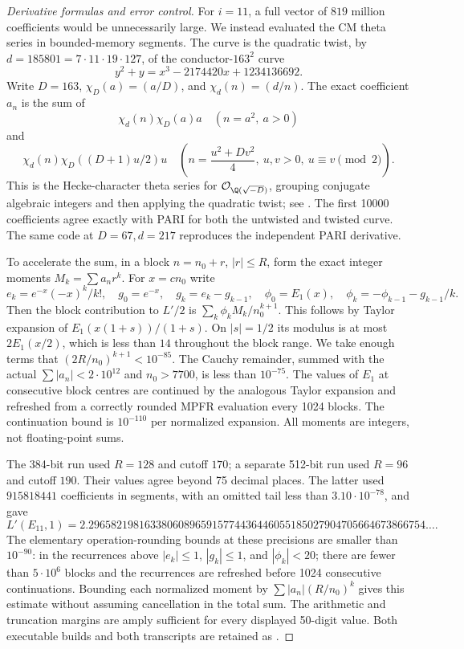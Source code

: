 \begin{proof}[Derivative formulas and error control]
For $i=11$, a full vector of $819$ million coefficients would be
unnecessarily large. We instead evaluated the CM theta series in
bounded-memory segments. The curve is the quadratic twist, by
$d=185801=7\cdot11\cdot19\cdot127$, of the conductor-$163^2$
curve
\[
 y^2+y=x^3-2174420x+1234136692.
\]
Write $D=163$, $\chi_D(a)=(a/D)$, and $\chi_d(n)=(d/n)$.
The exact coefficient $a_n$ is the sum of
\[
 \chi_d(n)\chi_D(a)a \quad(n=a^2,\ a>0)
\]
and
\[
 \chi_d(n)\chi_D((D+1)u/2)u
 \quad\left(n=\frac{u^2+Dv^2}{4},\ u,v>0,
                           \ u\equiv v\pmod2\right).
\]
This is the Hecke-character theta series for
$\mathcal O_{\Q(\sqrt{-D})}$, grouping conjugate algebraic integers
and then applying the quadratic twist; see
\citet[Section 3]{CrDarmon2009}. The first 10000 coefficients agree
exactly with PARI for both the untwisted and twisted curve. The same
code at $D=67,d=217$ reproduces the independent PARI derivative.

To accelerate the sum, in a block $n=n_0+r$, $|r|\leq R$, form the
exact integer moments $M_k=\sum a_nr^k$. For $x=cn_0$ write
\[
 e_k=e^{-x}(-x)^k/k!,\quad g_0=e^{-x},\quad
 g_k=e_k-g_{k-1},\quad
 \phi_0=E_1(x),\quad\phi_k=-\phi_{k-1}-g_{k-1}/k.
\]
Then the block contribution to $L'/2$ is
$\sum_k\phi_k M_k/n_0^{k+1}$. This follows by Taylor expansion
of $E_1(x(1+s))/(1+s)$. On $|s|=1/2$ its modulus is at most
$2E_1(x/2)$, which is less than $14$ throughout the block range.
We take enough terms that $(2R/n_0)^{k+1}<10^{-85}$.
The Cauchy remainder, summed with the actual
$\sum|a_n|<2\cdot10^{12}$ and $n_0>7700$, is less than
$10^{-75}$. The values of $E_1$ at consecutive block centres
are continued by the analogous Taylor expansion and refreshed
from a correctly rounded MPFR evaluation every 1024 blocks.
The continuation bound is $10^{-110}$ per normalized expansion.
All moments are integers, not floating-point sums.

The 384-bit run used $R=128$ and cutoff $170$; a separate 512-bit
run used $R=96$ and cutoff $190$. Their values agree beyond 75
decimal places. The latter used $915818441$ coefficients in
segments, with an omitted tail less than $3.10\cdot10^{-78}$,
and gave
\[
 L'(E_{11},1)=
 2.296582198163380608965915774436446055185027904705664673866754\ldots.
\]
The elementary operation-rounding bounds at these precisions are
smaller than $10^{-90}$: in the recurrences above
$|e_k|\leq1$, $|g_k|\leq1$, and $|\phi_k|<20$;
there are fewer than $5\cdot10^6$ blocks and the recurrences are
refreshed before 1024 consecutive continuations. Bounding each
normalized moment by $\sum|a_n|(R/n_0)^k$ gives this estimate
without assuming cancellation in the total sum. The arithmetic
and truncation margins are amply sufficient for every displayed
50-digit value. Both executable builds and both transcripts are
retained as .


\end{proof}
